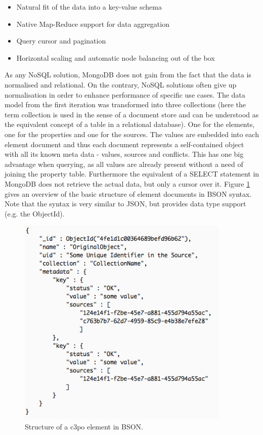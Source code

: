 \begin{itemize}
\item Natural fit of the data into a key-value schema
\item Native Map-Reduce support for data aggregation
\item Query cursor and pagination
\item Horizontal scaling and automatic node balancing out of the box
\end{itemize}

As any NoSQL solution, MongoDB does not gain from the fact that the data is normalised and relational. On the contrary, NoSQL solutions often give up normalisation in order to enhance performance of specific use cases. The data model from the first iteration was transformed into three collections (here the term collection is used in the sense of a document store and can be understood as the equivalent concept of a table in a relational database). One for the elements, one for the properties and one for the sources. The values are embedded into each element document and thus each document represents a self-contained object with all its known meta data - values, sources and conflicts. This has one big advantage when querying, as all values are already present without a need of joining the property table. Furthermore the equivalent of a SELECT statement in MongoDB does not retrieve the actual data, but only a cursor over it.
Figure \ref{fig:document_structure} gives an overview of the basic structure of element documents in BSON syntax. Note that the syntax is very similar to JSON, but provides data type support (e.g. the ObjectId).

\begin{figure}[htb]
\begin{center}
\includegraphics[width=4in]{figures/architecture/document_structure.png}
\caption{Structure of a c3po element in BSON.}
\label{fig:document_structure}
\end{center}
\end{figure}

